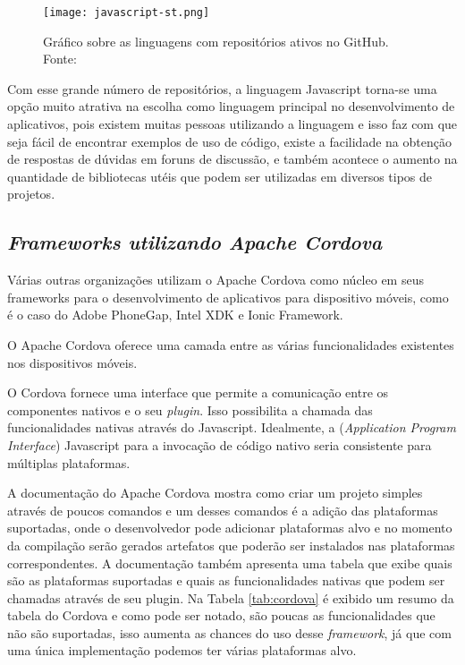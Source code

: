 \begin{figure}[!htb]
	\centering
	\texttt{[image: javascript-st.png]} %
	\caption[Linguagens com maior número de repositórios ativos no GitHub]{Gráfico sobre as linguagens com repositórios ativos no GitHub. Fonte: \cite{githut}}
	\label{fig:javascript}
\end{figure}

Com esse grande número de repositórios, a linguagem Javascript torna-se uma opção muito atrativa na escolha como linguagem principal no desenvolvimento de aplicativos, pois existem muitas pessoas utilizando a linguagem e isso faz com que seja fácil de encontrar exemplos de uso de código, existe a facilidade na obtenção de respostas de dúvidas em foruns de discussão, e também acontece o aumento na quantidade de bibliotecas utéis que podem ser utilizadas em diversos tipos de projetos.

\subsection{\normalfont\itshape Frameworks utilizando Apache Cordova}
Várias outras organizações utilizam o Apache Cordova como núcleo em seus frameworks para o desenvolvimento de aplicativos para dispositivo móveis, como é o caso do Adobe PhoneGap, Intel XDK e Ionic Framework.

O Apache Cordova oferece uma camada entre as várias funcionalidades existentes nos dispositivos móveis.
\begin{citacao}
O Cordova fornece uma interface que permite a comunicação entre os componentes nativos e o seu \textit{plugin}. Isso possibilita a chamada das funcionalidades nativas através do Javascript. Idealmente, a  (\textit{Application Program Interface}) Javascript para a invocação de código nativo seria consistente para múltiplas plataformas. \cite{cordova}
\end{citacao}

A documentação do Apache Cordova mostra como criar um projeto simples através de poucos comandos e um desses comandos é a adição das plataformas suportadas, onde o desenvolvedor pode adicionar plataformas alvo e no momento da compilação serão gerados artefatos que poderão ser instalados nas plataformas correspondentes.
A documentação também apresenta uma tabela que exibe quais são as plataformas suportadas e quais as funcionalidades nativas que podem ser chamadas através de seu plugin.
Na Tabela \ref{tab:cordova} é exibido um resumo da tabela do Cordova e como pode ser notado, são poucas as funcionalidades que não são suportadas, isso aumenta as chances do uso desse \textit{framework}, já que com uma única implementação podemos ter várias plataformas alvo.

